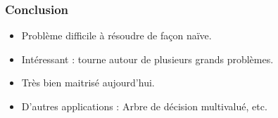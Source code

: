 \documentclass[handout]{beamer}
\begin{document}
\begin{frame}
  \frametitle{Conclusion}

  \begin{itemize}
  \item Problème difficile à résoudre de façon naïve.
  \item Intéressant : tourne autour de plusieurs grands problèmes.
  \item Très bien maitrisé aujourd'hui.
  \item D'autres applications : Arbre de décision multivalué, etc.
  \end{itemize}

\end{frame}
\end{document}
